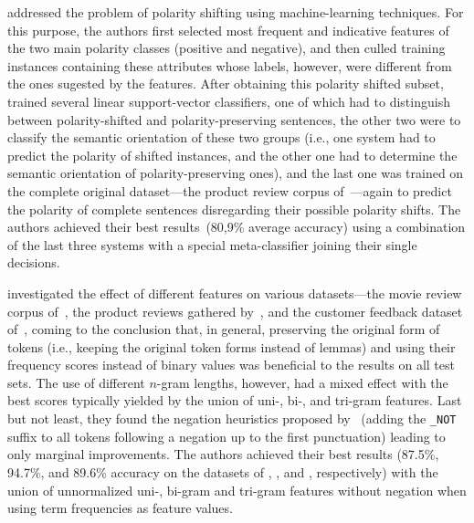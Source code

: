 \citet{Li:10b} addressed the problem of polarity shifting using
machine-learning techniques.  For this purpose, the authors first
selected most frequent and indicative features of the two main
polarity classes (positive and negative), and then culled training
instances containing these attributes whose labels, however, were
different from the ones sugested by the features.  After obtaining
this polarity shifted subset, \citeauthor{Li:10b} trained several
linear support-vector classifiers, one of which had to distinguish
between polarity-shifted and polarity-preserving sentences, the other
two were to classify the semantic orientation of these two groups
(i.e., one system had to predict the polarity of shifted instances,
and the other one had to determine the semantic orientation of
polarity-preserving ones), and the last one was trained on the
complete original dataset---the product review corpus
of~\citet{Blitzer:06}---again to predict the polarity of complete
sentences disregarding their possible polarity shifts.  The authors
achieved their best results~(80,9\% average accuracy) using a
combination of the last three systems with a special meta-classifier
joining their single decisions.



\citet{Mejova:11} investigated the effect of different features on
various datasets---the movie review corpus of~\citet{Pang:04}, the
product reviews gathered by~\citet{Jindal:07}, and the customer
feedback dataset of~\citet{Blitzer:06}, coming to the conclusion that,
in general, preserving the original form of tokens (i.e., keeping the
original token forms instead of lemmas) and using their frequency
scores instead of binary values was beneficial to the results on all
test sets.  The use of different $n$-gram lengths, however, had a
mixed effect with the best scores typically yielded by the union of
uni-, bi-, and tri-gram features.  Last but not least, they found the
negation heuristics proposed by~\citet{Das:01} (adding the
\texttt{\_NOT} suffix to all tokens following a negation up to the
first punctuation) leading to only marginal improvements.  The authors
achieved their best results (87.5\%, 94.7\%, and 89.6\% accuracy on
the datasets of \citet{Pang:04}, \citet{Jindal:07}, and
\citet{Blitzer:06}, respectively) with the union of unnormalized uni-,
bi-gram and tri-gram features without negation when using term
frequencies as feature values.

